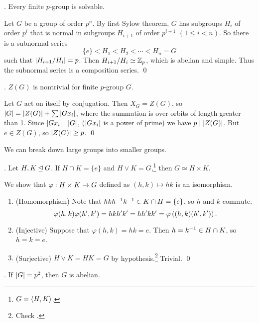 
\thm. Every finite \(p\)-group is solvable.

\pf Let \(G\) be a group of order \(p^n\). By first Sylow theorem, \(G\) has subgroups \(H_i\) of order \(p^i\) that is normal in subgroups \(H_{i+1}\) of order \(p^{i+1}\) \((1 \leq i < n)\). So there is a subnormal series
\[
    \{e\} < H_1 < H_2 < \cdots < H_n = G
\]
such that \(\left| H_{i+1}/H_i \right| = p\). Then \(H_{i+1}/H_i \simeq \mathbb{Z}_p\), which is abelian and simple. Thus the subnormal series is a composition series. \qed

\thm. \(Z(G)\) is nontrivial for finite \(p\)-group \(G\).

\pf Let \(G\) act on itself by conjugation. Then \(X_G = Z(G)\), so \(\left| G \right| = \left| Z(G) \right| + \sum \left| Gx_i \right|\), where the summation is over orbits of length greater than 1. Since \(\left| Gx_i \right| \mid \left| G \right|\), (\(\left| Gx_i \right|\) is a power of prime) we have \(p \mid \left| Z(G) \right|\). But \(e \in Z(G)\), so \(\left| Z(G) \right| \geq p\). \qed

We can break down large groups into smaller groups.

\lemma. Let \(H, K \unlhd G\). If \(H \cap K = \{e\}\) and \(H \vee K = G\),\footnote{\(G = \left\langle H, K \right\rangle\).} then \(G \simeq H \times K\).

\pf We show that \(\varphi : H \times K \rightarrow G\) defined as \((h, k) \mapsto hk\) is an isomorphism.
\begin{enumerate}
    \item (Homomorphism) Note that \(hkh^{-1} k^{-1} \in K \cap H = \{e\}\), so \(h\) and \(k\) commute.
    \[
        \varphi(h, k) \varphi(h', k') = hkh'k' = hh'kk' = \varphi\left( (h, k)(h', k') \right).
    \]
    \item (Injective) Suppose that \(\varphi(h, k) = hk = e\). Then \(h = k^{-1} \in H\cap K\), so \(h = k = e\).
    \item (Surjective) \(H \vee K = HK = G\) by hypothesis.\footnote{Check .} Trivial. \qed
\end{enumerate}

\thm. If \(\left| G \right| = p^2\), then \(G\) is abelian.

